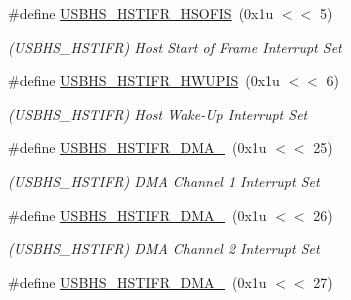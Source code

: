 \begin{DoxyCompactItemize}
\mbox{\label{group__SAMS70__USBHS_ga058eec9cbe60b84e56a33cb97ad48712}} 
\#define \mbox{\hyperlink{group__SAMS70__USBHS_ga058eec9cbe60b84e56a33cb97ad48712}{U\+S\+B\+H\+S\+\_\+\+H\+S\+T\+I\+F\+R\+\_\+\+H\+S\+O\+F\+IS}}~(0x1u $<$$<$ 5)
\begin{DoxyCompactList}\small\item\em (U\+S\+B\+H\+S\+\_\+\+H\+S\+T\+I\+FR) Host Start of Frame Interrupt Set \end{DoxyCompactList}\item 
\mbox{\label{group__SAMS70__USBHS_gabfdb08e9e4fe591cd781dd845c9b7712}} 
\#define \mbox{\hyperlink{group__SAMS70__USBHS_gabfdb08e9e4fe591cd781dd845c9b7712}{U\+S\+B\+H\+S\+\_\+\+H\+S\+T\+I\+F\+R\+\_\+\+H\+W\+U\+P\+IS}}~(0x1u $<$$<$ 6)
\begin{DoxyCompactList}\small\item\em (U\+S\+B\+H\+S\+\_\+\+H\+S\+T\+I\+FR) Host Wake-\/\+Up Interrupt Set \end{DoxyCompactList}\item 
\mbox{\label{group__SAMS70__USBHS_gac1888edbfcc052261aa510d80d58e295}} 
\#define \mbox{\hyperlink{group__SAMS70__USBHS_gac1888edbfcc052261aa510d80d58e295}{U\+S\+B\+H\+S\+\_\+\+H\+S\+T\+I\+F\+R\+\_\+\+D\+M\+A\+\_}}~(0x1u $<$$<$ 25)
\begin{DoxyCompactList}\small\item\em (U\+S\+B\+H\+S\+\_\+\+H\+S\+T\+I\+FR) D\+MA Channel 1 Interrupt Set \end{DoxyCompactList}\item 
\mbox{\label{group__SAMS70__USBHS_ga50434e1d59cd6cdc2450bd0006417753}} 
\#define \mbox{\hyperlink{group__SAMS70__USBHS_ga50434e1d59cd6cdc2450bd0006417753}{U\+S\+B\+H\+S\+\_\+\+H\+S\+T\+I\+F\+R\+\_\+\+D\+M\+A\+\_}}~(0x1u $<$$<$ 26)
\begin{DoxyCompactList}\small\item\em (U\+S\+B\+H\+S\+\_\+\+H\+S\+T\+I\+FR) D\+MA Channel 2 Interrupt Set \end{DoxyCompactList}\item 
\mbox{\label{group__SAMS70__USBHS_ga579f95492fa987c10290c53146a8b647}} 
\#define \mbox{\hyperlink{group__SAMS70__USBHS_ga579f95492fa987c10290c53146a8b647}{U\+S\+B\+H\+S\+\_\+\+H\+S\+T\+I\+F\+R\+\_\+\+D\+M\+A\+\_}}~(0x1u $<$$<$ 27)
$$
\end{DoxyCompactItemize}
